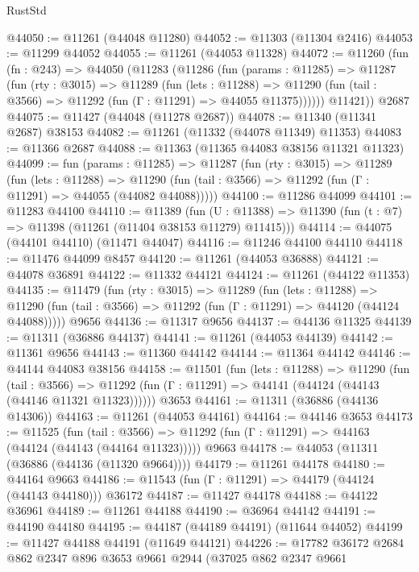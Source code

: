 \begin{lexlean}{RustStd}
\begin{coremodule}
@44050 := @11261 (@44048 @11280)
@44052 := @11303 (@11304 @2416)
@44053 := @11299 @44052
@44055 := @11261 (@44053 @11328)
@44072 := @11260
    (fun (fn : @243) =>
    @44050
      (@11283
        (@11286
          (fun (params : @11285) =>
          @11287
            (fun (rty : @3015) =>
            @11289
              (fun (lets : @11288) =>
              @11290 (fun (tail : @3566) => @11292 (fun (Γ : @11291) => @44055 @11375))))))
        @11421))
    @2687
@44075 := @11427 (@44048 (@11278 @2687))
@44078 := @11340 (@11341 @2687) @38153
@44082 := @11261 (@11332 (@44078 @11349) @11353)
@44083 := @11366 @2687
@44088 := @11363 (@11365 @44083 @38156 @11321 @11323)
@44099 := fun (params : @11285) =>
  @11287
    (fun (rty : @3015) =>
    @11289
      (fun (lets : @11288) =>
      @11290 (fun (tail : @3566) => @11292 (fun (Γ : @11291) => @44055 (@44082 @44088)))))
@44100 := @11286 @44099
@44101 := @11283 @44100
@44110 := @11389
    (fun (U : @11388) => @11390 (fun (t : @7) => @11398 (@11261 (@11404 @38153 @11279) @11415)))
@44114 := @44075 (@44101 @44110) (@11471 @44047)
@44116 := @11246 @44100 @44110
@44118 := @11476 @44099 @8457
@44120 := @11261 (@44053 @36888)
@44121 := @44078 @36891
@44122 := @11332 @44121
@44124 := @11261 (@44122 @11353)
@44135 := @11479
    (fun (rty : @3015) =>
    @11289
      (fun (lets : @11288) =>
      @11290 (fun (tail : @3566) => @11292 (fun (Γ : @11291) => @44120 (@44124 @44088)))))
    @9656
@44136 := @11317 @9656
@44137 := @44136 @11325
@44139 := @11311 (@36886 @44137)
@44141 := @11261 (@44053 @44139)
@44142 := @11361 @9656
@44143 := @11360 @44142
@44144 := @11364 @44142
@44146 := @44144 @44083 @38156
@44158 := @11501
    (fun (lets : @11288) =>
    @11290
      (fun (tail : @3566) =>
      @11292 (fun (Γ : @11291) => @44141 (@44124 (@44143 (@44146 @11321 @11323))))))
    @3653
@44161 := @11311 (@36886 (@44136 @14306))
@44163 := @11261 (@44053 @44161)
@44164 := @44146 @3653
@44173 := @11525
    (fun (tail : @3566) => @11292 (fun (Γ : @11291) => @44163 (@44124 (@44143 (@44164 @11323)))))
    @9663
@44178 := @44053 (@11311 (@36886 (@44136 (@11320 @9664))))
@44179 := @11261 @44178
@44180 := @44164 @9663
@44186 := @11543 (fun (Γ : @11291) => @44179 (@44124 (@44143 @44180))) @36172
@44187 := @11427 @44178
@44188 := @44122 @36961
@44189 := @11261 @44188
@44190 := @36964 @44142
@44191 := @44190 @44180
@44195 := @44187 (@44189 @44191) (@11644 @44052)
@44199 := @11427 @44188 @44191 (@11649 @44121)
@44226 := @17782
    @36172
    @2684
    @862
    @2347
    @896
    @3653
    @9661
    @2944
    (@37025
      @862
      @2347
      @9661

\end{coremodule}
\end{lexlean}
